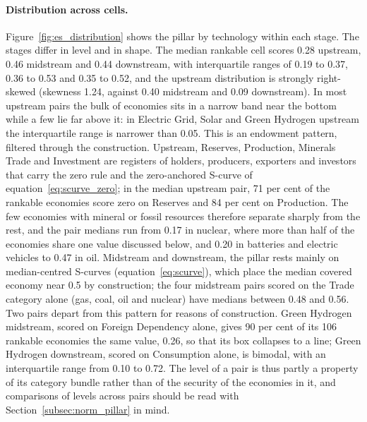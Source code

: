 \paragraph{Distribution across cells.} Figure~\ref{fig:es_distribution} shows the pillar by
technology within each stage. The stages differ in level and in shape. The median rankable cell
scores 0.28 upstream, 0.46 midstream and 0.44 downstream, with interquartile ranges of 0.19 to
0.37, 0.36 to 0.53 and 0.35 to 0.52, and the upstream distribution is strongly right-skewed
(skewness 1.24, against 0.40 midstream and 0.09 downstream). In most upstream pairs the bulk of
economies sits in a narrow band near the bottom while a few lie far above it: in Electric Grid,
Solar and Green Hydrogen upstream the interquartile range is narrower than 0.05. This is an
endowment pattern, filtered through the construction. Upstream, Reserves, Production, Minerals
Trade and Investment are registers of holders, producers, exporters and investors that carry
the zero rule and the zero-anchored S-curve of equation~\eqref{eq:scurve_zero}; in the median
upstream pair, 71 per cent of the rankable economies score zero on Reserves and 84 per cent on
Production. The few economies with mineral or fossil resources therefore separate sharply from
the rest, and the pair medians run from 0.17 in nuclear, where more than half of the economies
share one value discussed below, and 0.20 in batteries and electric vehicles to 0.47 in oil.
Midstream and downstream, the pillar rests mainly on median-centred S-curves
(equation~\eqref{eq:scurve}), which place the median covered economy near 0.5 by construction;
the four midstream pairs scored on the Trade category alone (gas, coal, oil and nuclear) have
medians between 0.48 and 0.56. Two pairs depart from this pattern for reasons of construction.
Green Hydrogen midstream, scored on Foreign Dependency alone, gives 90 per cent of its 106
rankable economies the same value, 0.26, so that its box collapses to a line; Green Hydrogen
downstream, scored on Consumption alone, is bimodal, with an interquartile range from 0.10 to
0.72. The level of a pair is thus partly a property of its category bundle rather than of the
security of the economies in it, and comparisons of levels across pairs should be read with
Section~\ref{subsec:norm_pillar} in mind.

